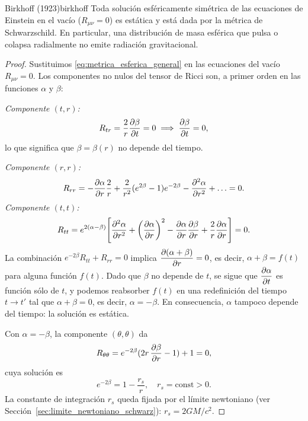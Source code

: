 \begin{teorema}{Birkhoff (1923)}{birkhoff}
Toda solución esféricamente simétrica de las ecuaciones de Einstein en el vacío ($R_{\mu\nu} = 0$) es estática y está dada por la métrica de Schwarzschild. En particular, una distribución de masa esférica que pulsa o colapsa radialmente no emite radiación gravitacional.
\end{teorema}

\begin{proof}
Sustituimos \eqref{eq:metrica_esferica_general} en las ecuaciones del vacío $R_{\mu\nu} = 0$. Los componentes no nulos del tensor de Ricci son, a primer orden en las funciones $\alpha$ y $\beta$:

\textit{Componente $(t,r)$:}
\begin{equation}
  R_{tr} = \frac{2}{r}\dfrac{\partial \beta}{\partial t} = 0 \implies \dfrac{\partial \beta}{\partial t} = 0,
\end{equation}
lo que significa que $\beta = \beta(r)$ no depende del tiempo.

\textit{Componente $(r,r)$:}
\begin{equation}
  R_{rr} = -\dfrac{\partial \alpha}{\partial r}\frac{2}{r} + \frac{2}{r^2}(e^{2\beta}-1)e^{-2\beta}
           -\dfrac{\partial^2 \alpha}{\partial r^2} + \ldots = 0.
\end{equation}
\textit{Componente $(t,t)$:}
\begin{equation}
  R_{tt} = e^{2(\alpha-\beta)}\!\left[\dfrac{\partial^2 \alpha}{\partial r^2} + \left(\dfrac{\partial \alpha}{\partial r}\right)^2
           - \dfrac{\partial \alpha}{\partial r}\dfrac{\partial \beta}{\partial r} + \frac{2}{r}\dfrac{\partial \alpha}{\partial r}\right] = 0.
\end{equation}
La combinación $e^{-2\beta}R_{tt} + R_{rr} = 0$ implica $\dfrac{\partial (\alpha+\beta)}{\partial r} = 0$, es decir, $\alpha + \beta = f(t)$ para alguna función $f(t)$. Dado que $\beta$ no depende de $t$, se sigue que $\dfrac{\partial \alpha}{\partial t}$ es función sólo de $t$, y podemos reabsorber $f(t)$ en una redefinición del tiempo $t \to t'$ tal que $\alpha + \beta = 0$, es decir, $\alpha = -\beta$. En consecuencia, $\alpha$ tampoco depende del tiempo: la solución es estática.

Con $\alpha = -\beta$, la componente $(\theta,\theta)$ da
\begin{equation}
  R_{\theta\theta} = e^{-2\beta}(2r\,\dfrac{\partial \beta}{\partial r} - 1) + 1 = 0,
\end{equation}
cuya solución es
\begin{equation}
  e^{-2\beta} = 1 - \frac{r_s}{r}, \quad r_s = \text{const} > 0.
\end{equation}
La constante de integración $r_s$ queda fijada por el límite newtoniano (ver Sección~\ref{sec:limite_newtoniano_schwarz}): $r_s = 2GM/c^2$.
\end{proof}

